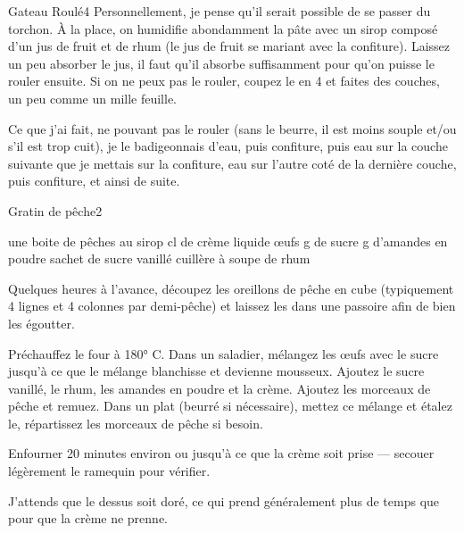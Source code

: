 \begin{recette}{Gateau Roulé}{4}{}{}
Personnellement, je pense qu'il serait possible de se passer du torchon. À la place, on humidifie abondamment la pâte avec un sirop composé d'un jus de fruit et de rhum (le jus de fruit se mariant avec la confiture). Laissez un peu absorber le jus, il faut qu'il absorbe suffisamment pour qu'on puisse le rouler ensuite. Si on ne peux pas le rouler, coupez le en 4 et faites des couches, un peu comme un mille feuille.

Ce que j'ai fait, ne pouvant pas le rouler (sans le beurre, il est moins souple et/ou s'il est trop cuit), je le badigeonnais d'eau, puis confiture, puis eau sur la couche suivante que je mettais sur la confiture, eau sur l'autre coté de la dernière couche, puis confiture, et ainsi de suite.

\end{recette}

\begin{recette}{Gratin de pêche}{2}{}{}
\begin{ingredients}
\ingredient une boite de pêches au sirop
 cl de crème liquide
 œufs 
 g de sucre 
 g d'amandes en poudre 
 sachet de sucre vanillé
 cuillère à soupe de rhum
\end{ingredients}

\begin{preparation}
\etape Quelques heures à l'avance, découpez les oreillons de pêche en cube (typiquement 4 lignes et 4 colonnes par demi-pêche) et laissez les dans une passoire afin de bien les égoutter.

\etape Préchauffez le four à 180° C.
\etape Dans un saladier, mélangez les œufs avec le sucre jusqu'à ce que le mélange blanchisse et devienne mousseux. Ajoutez le sucre vanillé, le rhum, les amandes en poudre et la crème. 
\etape Ajoutez les morceaux de pêche et remuez.
\etape Dans un plat (beurré si nécessaire), mettez ce mélange et étalez le, répartissez les morceaux de pêche si besoin.
\end{preparation}

\begin{cuisson}
Enfourner 20 minutes environ ou jusqu'à ce que la crème soit prise --- secouer légèrement le ramequin pour vérifier.

\begin{remarque}
J'attends que le dessus soit doré, ce qui prend généralement plus de temps que pour que la crème ne prenne.
\end{remarque}
\end{cuisson}

\end{recette}

